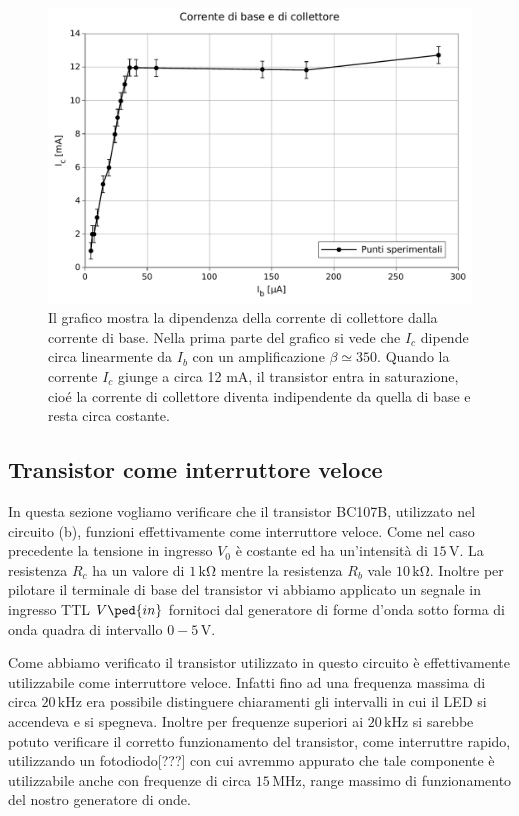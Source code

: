 \begin{figure}
    \includegraphics[scale=0.65]{a.pdf}
    \caption{Il grafico
mostra la dipendenza
della corrente di collettore dalla corrente di
base. Nella prima parte del grafico si vede
che 
$I_c$ dipende circa linearmente da $I_b$ con
un amplificazione $\beta \simeq
350$. Quando la corrente $I_c$ giunge
a circa 12 mA, il transistor entra in saturazione, cioé la corrente di collettore diventa
indipendente da quella di base e resta circa
costante.}
    \label{fig:a}
\end{figure}

\subsection*{Transistor come interruttore veloce}

In questa sezione vogliamo verificare che il transistor BC107B, utilizzato nel circuito (b), funzioni effettivamente come interruttore veloce.
Come nel caso precedente la tensione in ingresso $V_0$ è costante ed ha un'intensità di $15\,\si{\volt}$. La resistenza $R_c$ ha un valore di $1\,\si{\kilo\ohm}$ mentre la resistenza $R_b$ vale $10\,\si{\kilo\ohm}$. Inoltre per pilotare il terminale di base del transistor vi abbiamo applicato un segnale in ingresso TTL $V\ped{in}$ fornitoci dal generatore di forme d'onda sotto forma di onda quadra di intervallo $0-5\,\si{\volt}$.

Come abbiamo verificato il transistor utilizzato in questo circuito è effettivamente utilizzabile come interruttore veloce. Infatti fino ad una frequenza massima di circa $20\,\si{\kilo\hertz}$ era possibile distinguere chiaramenti gli intervalli in cui il LED si accendeva e si spegneva. Inoltre per frequenze superiori ai $20\,\si{\kilo\hertz}$  si sarebbe potuto verificare il corretto funzionamento del transistor, come interruttre rapido, utilizzando un fotodiodo[???] con cui avremmo appurato che tale componente è utilizzabile anche con frequenze di circa $15\,\si{\mega\hertz}$, range massimo di funzionamento del nostro generatore di onde.

